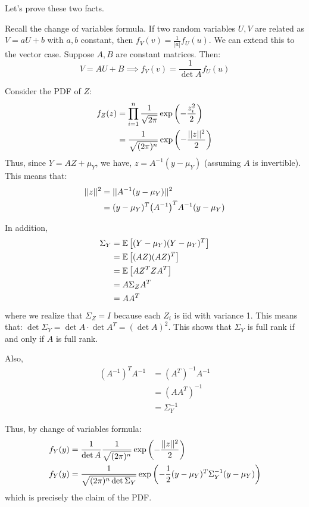 Let's prove these two facts.
\begin{proof*}
    Recall the change of variables formula. If two random variables $U, V$ are related as $V = aU + b$ with $a, b$ constant,
    then $f_V(v) = \frac{1}{|a|} f_U(u)$. We can extend this to the vector case. Suppose $A, B$ are constant matrices. Then:
    \[ V = AU + B \implies f_V(v) = \frac{1}{\det A} f_U(u) \]

    Consider the PDF of $Z$:
    \begin{align*}
        f_Z(z) &= \prod_{i = 1}^n \frac{1}{\sqrt{2\pi}} \exp\qty(-\frac{z_i^2}{2}) \\
        &= \frac{1}{\sqrt{(2\pi)^n}} \exp\qty(-\frac{||z||^2}{2}) \\
    \end{align*}
    Thus, since $Y = AZ + \mu_Y$, we have, $z = A^{-1} (y - \mu_Y)$ (assuming $A$ is invertible). This means that:
    \begin{align*}
        ||z||^2 &= ||A^{-1}(y - \mu_Y)||^2 \\
        &= (y - \mu_Y)^T \qty(A^{-1})^T A^{-1} (y - \mu_Y) \\
    \end{align*}

    In addition,
    \begin{align*}
        \Sigma_Y &= \mathbb{E}\left[ (Y - \mu_Y) (Y - \mu_Y)^T \right] \\
        &= \mathbb{E}\left[ (AZ) (AZ)^T \right] \\
        &= \mathbb{E}\left[ A Z^T Z A^T \right] \\
        &= A \Sigma_Z A^T \\
        &= A A^T \\
    \end{align*}
    where we realize that $\Sigma_Z = I$ because each $Z_i$ is iid with variance 1. This means that:
    $\det \Sigma_Y = \det A \cdot \det A^T = (\det A)^2$. This shows that $\Sigma_Y$ is full rank if and only if $A$ is full rank.

    Also, 
    \begin{align*}
        (A^{-1})^T A^{-1} &= (A^T)^{-1} A^{-1} \\
        &= (AA^T)^{-1} \\
        &= \Sigma_Y^{-1}
    \end{align*}

    Thus, by change of variables formula:
    \begin{align*}
        f_Y(y) &= \frac{1}{\det A} \frac{1}{\sqrt{(2\pi)^n}} \exp\qty(-\frac{||z||^2}{2}) \\
        f_Y(y) &= \frac{1}{\sqrt{(2\pi)^n \det \Sigma_Y}} \exp\qty(-\frac{1}{2} (y - \mu_Y)^T \Sigma_Y^{-1} (y - \mu_Y))
    \end{align*}
    which is precisely the claim of the PDF.
\end{proof*}

